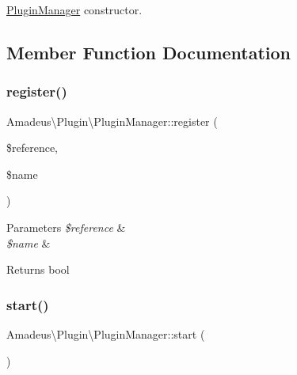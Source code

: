 \hyperlink{classAmadeus_1_1Plugin_1_1PluginManager}{Plugin\+Manager} constructor. 

\subsection{Member Function Documentation}
\mbox{\label{classAmadeus_1_1Plugin_1_1PluginManager_ae379fe4637a82326105a58144610daa6}} 
\subsubsection{\texorpdfstring{register()}{register()}}
{\footnotesize\ttfamily Amadeus\textbackslash{}\+Plugin\textbackslash{}\+Plugin\+Manager\+::register (\begin{DoxyParamCaption}\item[{}]{\$reference,  }\item[{}]{\$name }\end{DoxyParamCaption})}


\begin{DoxyParams}{Parameters}
{\em \$reference} & \\
\hline
{\em \$name} & \\
\hline
\end{DoxyParams}
\begin{DoxyReturn}{Returns}
bool 
\end{DoxyReturn}
\mbox{\label{classAmadeus_1_1Plugin_1_1PluginManager_a93164584ff284c3ab702320fd33101d5}} 
\subsubsection{\texorpdfstring{start()}{start()}}
{\footnotesize\ttfamily Amadeus\textbackslash{}\+Plugin\textbackslash{}\+Plugin\+Manager\+::start (\begin{DoxyParamCaption}{ }\end{DoxyParamCaption})}

